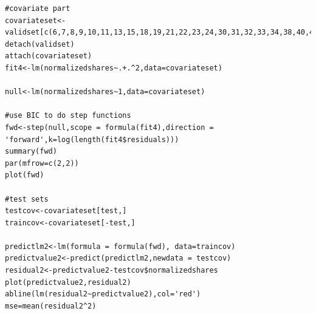 \documentclass[letterpaper,12pt]{article}
\begin{document}
\begin{lstlisting}
#covariate part
covariateset<-validset[c(6,7,8,9,10,11,13,15,18,19,21,22,23,24,30,31,32,33,34,38,40,43,50,55,57,60)]
detach(validset)
attach(covariateset)
fit4<-lm(normalizedshares~.+.^2,data=covariateset)

null<-lm(normalizedshares~1,data=covariateset)

#use BIC to do step functions
fwd<-step(null,scope = formula(fit4),direction = 'forward',k=log(length(fit4$residuals)))
summary(fwd)
par(mfrow=c(2,2))
plot(fwd)

#test sets
testcov<-covariateset[test,]
traincov<-covariateset[-test,]

predictlm2<-lm(formula = formula(fwd), data=traincov)
predictvalue2<-predict(predictlm2,newdata = testcov)
residual2<-predictvalue2-testcov$normalizedshares
plot(predictvalue2,residual2)
abline(lm(residual2~predictvalue2),col='red')
mse=mean(residual2^2)
\end{lstlisting}
\end{document}
